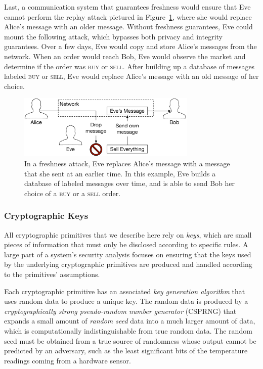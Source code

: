 Last, a communication system that guarantees freshness would ensure that Eve
cannot perform the replay attack pictured in Figure~\ref{fig:freshness_attack},
where she would replace Alice's message with an older message. Without
freshness guarantees, Eve could mount the following attack, which bypasses
both privacy and integrity guarantees. Over a few days, Eve would copy and
store Alice's messages from the network. When an order would reach Bob, Eve
would observe the market and determine if the order was \textsc{buy} or
\textsc{sell}. After building up a database of messages labeled \textsc{buy} or
\textsc{sell}, Eve would replace Alice's message with an old message of her
choice.

\begin{figure}[hbt]
  \centering
  \includegraphics[width=85mm]{figures/integrity_attack.pdf}
  \caption{
    In a freshness attack, Eve replaces Alice's message with a message that she
    sent at an earlier time. In this example, Eve builds a database of labeled
    messages over time, and is able to send Bob her choice of a \textsc{buy} or
    a \textsc{sell} order.
  }
  \label{fig:freshness_attack}
\end{figure}


\subsubsection{Cryptographic Keys}

All cryptographic primitives that we describe here rely on \textit{keys}, which
are small pieces of information that must only be disclosed according to
specific rules. A large part of a system's security analysis focuses on
ensuring that the keys used by the underlying cryptographic primitives are
produced and handled according to the primitives' assumptions.

Each cryptographic primitive has an associated \textit{key generation
algorithm} that uses random data to produce a unique key. The random data is
produced by a \textit{cryptographically strong pseudo-random number generator}
(CSPRNG) that expands a small amount of \textit{random seed} data into a much
larger amount of data, which is computationally indistinguishable from true
random data. The random seed must be obtained from a true source of randomness
whose output cannot be predicted by an adversary, such as the least significant
bits of the temperature readings coming from a hardware sensor.


